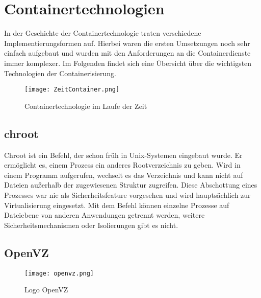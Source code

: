 \section{Containertechnologien} 
\label{sec:Containertechnologien}

In der Geschichte der Containertechnologie traten verschiedene Implementierungsformen auf.
Hierbei waren die ersten Umsetzungen noch sehr einfach aufgebaut und wurden mit den Anforderungen an die Containerdienste immer komplexer.
Im Folgenden findet sich eine Übersicht über die wichtigsten Technologien der Containerisierung.

\begin{figure}[H]
	\begin{center}
		\texttt{[image: ZeitContainer.png]}
	\end{center}
	\caption[Containertechnologie im Laufe der Zeit]{Containertechnologie im Laufe der Zeit}
	\label{fig:CTZeit}
\end{figure}


\subsection*{chroot}
\label{sec:chroot}

Chroot ist ein Befehl, der schon früh in Unix-Systemen eingebaut wurde.
Er ermöglicht es, einem Prozess ein anderes Rootverzeichnis zu geben.
Wird in einem Programm  aufgerufen, wechselt es das Verzeichnis und kann nicht auf Dateien außerhalb der zugewiesenen Struktur zugreifen.
Diese Abschottung eines Prozesses war nie als Sicherheitsfeature vorgesehen und wird hauptsächlich zur Virtualisierung eingesetzt.
Mit dem Befehl können einzelne Prozesse auf Dateiebene von anderen Anwendungen getrennt werden, weitere Sicherheitsmechanismen oder Isolierungen gibt es nicht. \citep{IEEE7830207,569694, MANPAGE01}
\newpage
\subsection*{OpenVZ}
\label{sec:OpenVZ}

\begin{wrapfigure}{l}{0.4\textwidth}
	\vspace{-40pt}
	\begin{center}
		\texttt{[image: openvz.png]}
	\end{center}
	\vspace{-15pt}
	\caption[Logo OpenVZ]{Logo OpenVZ \footnotemark}
	\label{fig:openvz}
	\vspace{-30pt}
\end{wrapfigure}

